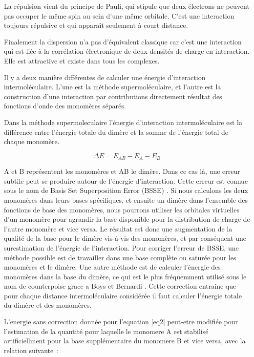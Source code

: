 La répulsion vient du principe de Pauli, qui stipule que deux électrons ne peuvent pas occuper le même spin au sein d’une même orbitale. C’est une interaction toujours répulsive et qui apparaît seulement à court distance.

Finalement la dispersion n’a pas d’équivalent classique car c’est une interaction qui est liée à la corrélation électronique de deux densités de charge en interaction. Elle est attractive et existe dans tous les complexes.

Il y a deux manière différentes de calculer une énergie d’interaction intermoléculaire. L’une est la méthode supermoléculaire, et l’autre est la construction d’une interaction par contributions directement résultat des fonctions d’onde des monomères séparés.

Dans la méthode supermoleculaire l’énergie d’interaction intermoléculaire est la différence entre l’énergie totale du dimère et la somme de l’énergie total de chaque monomère.


\begin{equation}
\Delta E = E_{AB} - E_{A} - E_{B} \label{eq2}
\end{equation}

A et B représentent les monomères et AB le dimère. Dans ce cas là, une erreur subtile peut se produire autour de l’énergie d’interaction. Cette erreur est connue sous le nom de Basis Set Superposition Error (BSSE) \cite{sherrill2010counterpoise}. Si nous calculons les deux monomères dans leurs bases spécifiques, et ensuite un dimère dans l’ensemble des fonctions de base des monomères, nous pourrons utiliser les orbitales virtuelles d’un monomère pour agrandir la base disponible pour la distribution de charge de l’autre monomère et vice versa. Le résultat est donc une augmentation de la qualité de la base pour le dimère vis-à-vis des monomères, et par conséquent une surestimation de l’énergie de l’interaction. Pour corriger l’erreur de BSSE, une méthode possible est de travailler dans une base complète ou saturée pour les monomères et le dimère. Une autre méthode est de calculer l’énergie des monomères dans la base du dimère, ce qui est le plus fréquemment utilisé sous le nom de counterpoise grace a Boys et Bernardi \cite{boys1970calculation}. Cette correction entraîne que pour chaque distance intermoléculaire considérée il faut calculer l’énergie totale du dimère et des monomères.

L'energie sans correction donnée pour l'equation \ref{eq2}  peut-etre modifiée pour l'estimation de la quantité pour laquelle le monomere A est stabilisé artificiellment pour la base supplémentaire du monomere B et vice versa, avec la relation suivante :

